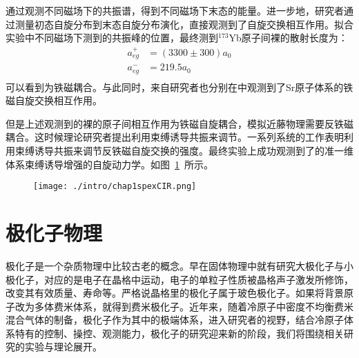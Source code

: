 通过观测不同磁场下的共振谱，得到不同磁场下末态的能量。进一步地，研究者通过测量初态自旋分布到末态自旋分布演化\cite{scazza2014observation,cappellini2014direct}，直接观测到了自旋交换相互作用。拟合实验中不同磁场下测到的共振峰的位置，最终测到${}^{173}$Yb原子间裸的散射长度为\cite{scazza2014observation,cappellini2014direct}：
\begin{equation}
\begin{split}
a_{e g}^{+}&=(3300 \pm 300) a_{0}\\
a_{e g}^{-}& = 219.5 a_0\\
\end{split}
\end{equation}
可以看到为铁磁耦合。与此同时，来自研究者也分别在中观测到了Sr原子体系的铁磁自旋交换相互作用\cite{zhang2014spectroscopic}。

但是上述观测到的裸的原子间相互作用为铁磁自旋耦合，模拟近藤物理需要反铁磁耦合。这时候理论研究者提出利用束缚诱导共振来调节。一系列系统的工作表明利用束缚诱导共振来调节反铁磁自旋交换的强度\cite{zhang2016kondo,cheng2017enhancing,zhang2018control,ji2018confinement,zhang2020tight,zhang2020controlling}。最终实验上成功观测到了的准一维体系束缚诱导增强的自旋动力学\cite{riegger2018localized}。如图~\ref{CIRspexexp}~所示。
\begin{figure}[!htbp]
    \centering
    \texttt{[image: ./intro/chap1spexCIR.png]}
    \label{CIRspexexp}
\end{figure}












\section{极化子物理}\label{sec:polaron}
极化子是一个杂质物理中比较古老的概念。早在固体物理中就有研究大极化子与小极化子\cite{landau1933bewegung,pekar1946autolocalization,frohlich1950xx,frohlich1954electrons,feynman1955slow,mahanmany}，对应的是电子在晶格中运动，电子的单粒子性质被晶格声子激发所修饰，改变其有效质量、寿命等。严格说晶格里的极化子属于玻色极化子。如果将背景原子改为多体费米体系，就得到费米极化子。近年来，随着冷原子中密度不均衡费米混合气体的制备，极化子作为其中的极端体系，进入研究者的视野，结合冷原子体系特有的控制、操控、观测能力，极化子的研究迎来新的阶段，我们将围绕相关研究的实验与理论展开。

